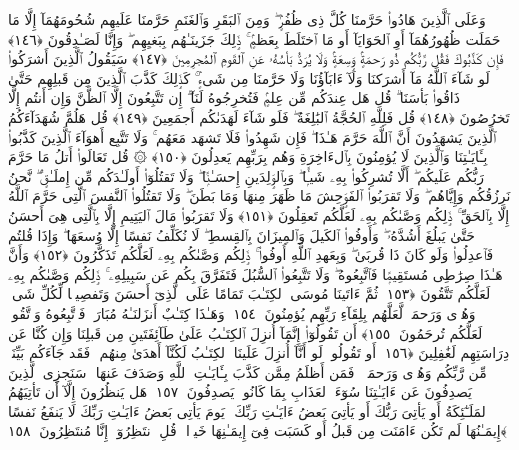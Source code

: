  وَعَلَى ٱلَّذِينَ هَادُوا۟ حَرَّمنَا كُلَّ ذِى ظُفُرٍۢ ۖ وَمِنَ ٱلبَقَرِ وَٱلغَنَمِ حَرَّمنَا عَلَيهِم شُحُومَهُمَآ إِلَّا مَا حَمَلَت ظُهُورُهُمَآ أَوِ ٱلحَوَايَآ أَو مَا ٱختَلَطَ بِعَظمٍۢ ۚ ذَٟلِكَ جَزَينَـٰهُم بِبَغيِهِم ۖ وَإِنَّا لَصَـٰدِقُونَ ﴿١٤٦﴾
 فَإِن كَذَّبُوكَ فَقُل رَّبُّكُم ذُو رَحمَةٍۢ وَٟسِعَةٍۢ وَلَا يُرَدُّ بَأسُهُۥ عَنِ ٱلقَومِ ٱلمُجرِمِينَ ﴿١٤٧﴾
 سَيَقُولُ ٱلَّذِينَ أَشرَكُوا۟ لَو شَآءَ ٱللَّهُ مَآ أَشرَكنَا وَلَآ ءَابَآؤُنَا وَلَا حَرَّمنَا مِن شَىءٍۢ ۚ كَذَٟلِكَ كَذَّبَ ٱلَّذِينَ مِن قَبلِهِم حَتَّىٰ ذَاقُوا۟ بَأسَنَا ۗ قُل هَل عِندَكُم مِّن عِلمٍۢ فَتُخرِجُوهُ لَنَآ ۖ إِن تَتَّبِعُونَ إِلَّا ٱلظَّنَّ وَإِن أَنتُم إِلَّا تَخرُصُونَ ﴿١٤٨﴾
 قُل فَلِلَّهِ ٱلحُجَّةُ ٱلبَٰلِغَةُ ۖ فَلَو شَآءَ لَهَدَىٰكُم أَجمَعِينَ ﴿١٤٩﴾
 قُل هَلُمَّ شُهَدَآءَكُمُ ٱلَّذِينَ يَشهَدُونَ أَنَّ ٱللَّهَ حَرَّمَ هَـٰذَا ۖ فَإِن شَهِدُوا۟ فَلَا تَشهَد مَعَهُم ۚ وَلَا تَتَّبِع أَهوَآءَ ٱلَّذِينَ كَذَّبُوا۟ بِـَٔايَـٰتِنَا وَٱلَّذِينَ لَا يُؤمِنُونَ بِٱلءَاخِرَةِ وَهُم بِرَبِّهِم يَعدِلُونَ ﴿١٥٠﴾
 ۞ قُل تَعَالَوا۟ أَتلُ مَا حَرَّمَ رَبُّكُم عَلَيكُم ۖ أَلَّا تُشرِكُوا۟ بِهِۦ شَيـًۭٔا ۖ وَبِٱلوَٟلِدَينِ إِحسَـٰنًۭا ۖ وَلَا تَقتُلُوٓا۟ أَولَـٰدَكُم مِّن إِملَـٰقٍۢ ۖ نَّحنُ نَرزُقُكُم وَإِيَّاهُم ۖ وَلَا تَقرَبُوا۟ ٱلفَوَٟحِشَ مَا ظَهَرَ مِنهَا وَمَا بَطَنَ ۖ وَلَا تَقتُلُوا۟ ٱلنَّفسَ ٱلَّتِى حَرَّمَ ٱللَّهُ إِلَّا بِٱلحَقِّ ۚ ذَٟلِكُم وَصَّىٰكُم بِهِۦ لَعَلَّكُم تَعقِلُونَ ﴿١٥١﴾
 وَلَا تَقرَبُوا۟ مَالَ ٱليَتِيمِ إِلَّا بِٱلَّتِى هِىَ أَحسَنُ حَتَّىٰ يَبلُغَ أَشُدَّهُۥ ۖ وَأَوفُوا۟ ٱلكَيلَ وَٱلمِيزَانَ بِٱلقِسطِ ۖ لَا نُكَلِّفُ نَفسًا إِلَّا وُسعَهَا ۖ وَإِذَا قُلتُم فَٱعدِلُوا۟ وَلَو كَانَ ذَا قُربَىٰ ۖ وَبِعَهدِ ٱللَّهِ أَوفُوا۟ ۚ ذَٟلِكُم وَصَّىٰكُم بِهِۦ لَعَلَّكُم تَذَكَّرُونَ ﴿١٥٢﴾
 وَأَنَّ هَـٰذَا صِرَٰطِى مُستَقِيمًۭا فَٱتَّبِعُوهُ ۖ وَلَا تَتَّبِعُوا۟ ٱلسُّبُلَ فَتَفَرَّقَ بِكُم عَن سَبِيلِهِۦ ۚ ذَٟلِكُم وَصَّىٰكُم بِهِۦ لَعَلَّكُم تَتَّقُونَ ﴿١٥٣﴾
 ثُمَّ ءَاتَينَا مُوسَى ٱلكِتَـٰبَ تَمَامًا عَلَى ٱلَّذِىٓ أَحسَنَ وَتَفصِيلًۭا لِّكُلِّ شَىءٍۢ وَهُدًۭى وَرَحمَةًۭ لَّعَلَّهُم بِلِقَآءِ رَبِّهِم يُؤمِنُونَ ﴿١٥٤﴾
 وَهَـٰذَا كِتَـٰبٌ أَنزَلنَـٰهُ مُبَارَكٌۭ فَٱتَّبِعُوهُ وَٱتَّقُوا۟ لَعَلَّكُم تُرحَمُونَ ﴿١٥٥﴾
 أَن تَقُولُوٓا۟ إِنَّمَآ أُنزِلَ ٱلكِتَـٰبُ عَلَىٰ طَآئِفَتَينِ مِن قَبلِنَا وَإِن كُنَّا عَن دِرَاسَتِهِم لَغَٰفِلِينَ ﴿١٥٦﴾
 أَو تَقُولُوا۟ لَو أَنَّآ أُنزِلَ عَلَينَا ٱلكِتَـٰبُ لَكُنَّآ أَهدَىٰ مِنهُم ۚ فَقَد جَآءَكُم بَيِّنَةٌۭ مِّن رَّبِّكُم وَهُدًۭى وَرَحمَةٌۭ ۚ فَمَن أَظلَمُ مِمَّن كَذَّبَ بِـَٔايَـٰتِ ٱللَّهِ وَصَدَفَ عَنهَا ۗ سَنَجزِى ٱلَّذِينَ يَصدِفُونَ عَن ءَايَـٰتِنَا سُوٓءَ ٱلعَذَابِ بِمَا كَانُوا۟ يَصدِفُونَ ﴿١٥٧﴾
 هَل يَنظُرُونَ إِلَّآ أَن تَأتِيَهُمُ ٱلمَلَـٰٓئِكَةُ أَو يَأتِىَ رَبُّكَ أَو يَأتِىَ بَعضُ ءَايَـٰتِ رَبِّكَ ۗ يَومَ يَأتِى بَعضُ ءَايَـٰتِ رَبِّكَ لَا يَنفَعُ نَفسًا إِيمَـٰنُهَا لَم تَكُن ءَامَنَت مِن قَبلُ أَو كَسَبَت فِىٓ إِيمَـٰنِهَا خَيرًۭا ۗ قُلِ ٱنتَظِرُوٓا۟ إِنَّا مُنتَظِرُونَ ﴿١٥٨﴾
